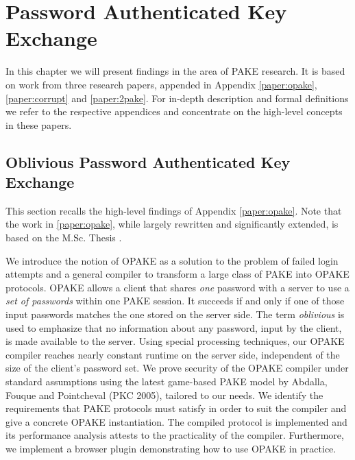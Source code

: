 \chapter{Password Authenticated Key Exchange}\label{ch:pake}
In this chapter we will present findings in the area of \ac{PAKE} research.
It is based on work from three research papers, appended in Appendix \ref{paper:opake}, \ref{paper:corrupt} and \ref{paper:2pake}.
For in-depth description and formal definitions we refer to the respective appendices and concentrate on the high-level concepts in these papers.

\section{Oblivious Password Authenticated Key Exchange} \label{sec:opake}
This section recalls the high-level findings of Appendix \ref{paper:opake}.
Note that the work in \ref{paper:opake}, while largely rewritten and significantly extended, is based on the M.Sc. Thesis \cite{Kiefer2012}.

We introduce the notion of \acl{OPAKE} as a solution to the problem of failed login attempts and a general compiler to transform a large class of \ac{PAKE} into \ac{OPAKE} protocols.
\ac{OPAKE} allows a client that shares \emph{one} password with a server to use a \emph{set of passwords} within one \ac{PAKE} session.
It succeeds if and only if one of those input passwords matches the one stored on the server side. The term \emph{oblivious} is used to emphasize that no information about any password, input by the client, is made available to the server.
Using special processing techniques, our \ac{OPAKE} compiler reaches nearly constant runtime on the server side, independent of the size of the client's password set.
We prove security of the \ac{OPAKE} compiler under standard assumptions using the latest game-based \ac{PAKE} model by Abdalla, Fouque and Pointcheval (PKC 2005), tailored to our needs.
We identify the requirements that \ac{PAKE} protocols must satisfy in order to suit the compiler and give a concrete \ac{OPAKE} instantiation.
The compiled protocol is implemented and its performance analysis attests to the practicality of the compiler.
Furthermore, we implement a browser plugin demonstrating how to use \ac{OPAKE} in practice.

